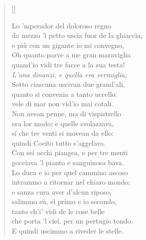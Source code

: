 \documentclass{article}
\begin{document}
\begin{verse}[\versewidth]
\begin{patverse*}
    Lo 'mperador del doloroso regno\\
    da mezzo 'l petto uscìa fuor de la ghiaccia;\\
    e più con un gigante io mi convegno,\\[10pt]
    Oh quanto parve a me gran maraviglia\\
    quand'io vidi tre facce a la sua testa!\\
    \emph{L'una dinanzi, e quella era vermiglia;}\\[10pt]
    Sotto ciascuna uscivan due grand'ali,\\
    quanto si convenia a tanto uccello:\\
    vele di mar non vid'io mai cotali.\\
    Non avean penne, ma di vispistrello\\
    era lor modo; e quelle svolazzava,\\
    sí che tre venti si movean da ello:\\
    quindi Cocito tutto s'aggelava.\\
    Con sei occhi piangea, e per tre menti\\
    gocciava 'l pianto e sanguinosa bava.\\[10pt]
    Lo duca e io per quel cammino ascoso\\
    intrammo a ritornar nel chiaro mondo;\\
    e sanza cura aver d'alcun riposo,\\
    salimmo sù, el primo e io secondo,\\
    tanto ch'i' vidi de le cose belle\\
    che porta 'l ciel, per un pertugio tondo.\\
    E quindi uscimmo a riveder le stelle.
  \end{patverse*}
\end{verse}

\end{document}
